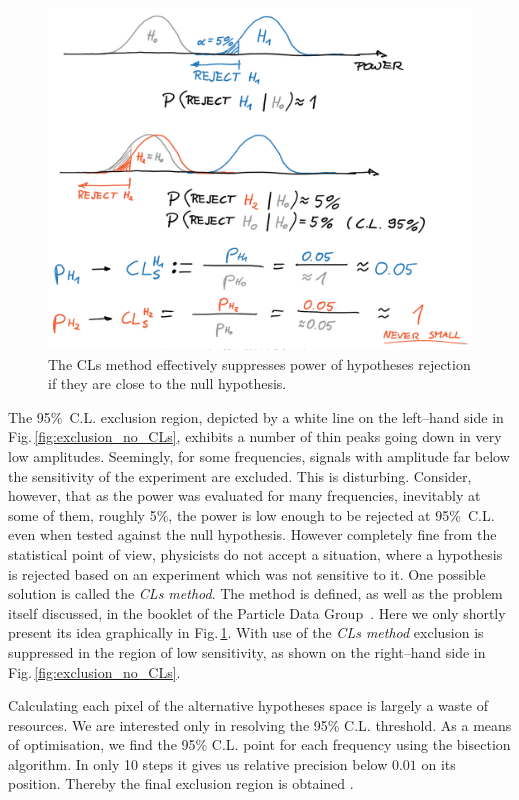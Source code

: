 \begin{figure}
  \centering \includegraphics[width=\linewidth]{gfx/axions/CLs.png}
  \caption{The CLs method effectively suppresses power of hypotheses rejection if they are close to the null hypothesis.}
  \label{fig:CLs}
\end{figure}


The 95\%~C.L. exclusion region, depicted by a white line on the left--hand side in Fig.\,\ref{fig:exclusion_no_CLs}, exhibits a number of thin peaks going down in very low amplitudes. Seemingly, for some frequencies, signals with amplitude far below the sensitivity of the experiment are excluded. This is disturbing. Consider, however, that as the power was evaluated for many frequencies, inevitably at some of them, roughly 5\%, the power is low enough to be rejected at 95\%~C.L. even when tested against the null hypothesis. However completely fine from the statistical point of view, physicists do not accept a situation, where a hypothesis is rejected based on an experiment which was not sensitive to it. One possible solution is called the \emph{CLs method}. The method is defined, as well as the problem itself discussed, in the booklet of the Particle Data Group~\citep{PDG2014}. Here we only shortly present its idea graphically in Fig.\,\ref{fig:CLs}. With use of the \emph{CLs method} exclusion is suppressed in the region of low sensitivity, as shown on the right--hand side in Fig.\,\ref{fig:exclusion_no_CLs}.

Calculating each pixel of the alternative hypotheses space is largely a waste of resources. We are interested only in resolving the 95\% C.L. threshold. As a means of optimisation, we find the 95\% C.L. point for each frequency using the bisection algorithm. In only 10 steps it gives us relative precision below $0.01$ on its position. Thereby the final exclusion region is obtained .
